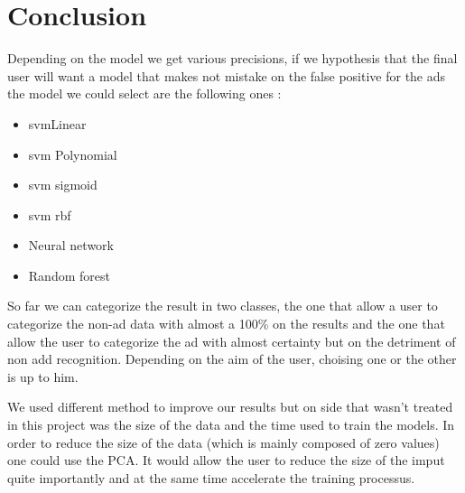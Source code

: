 \section{Conclusion}

Depending on the model we get various precisions, if we hypothesis that the final user will want a model that makes not mistake on the false positive for the ads the model we could select are the following ones :
\begin{itemize}
  \item svmLinear
  \item svm Polynomial
  \item svm sigmoid
  \item svm rbf
  \item Neural network
  \item Random forest
\end{itemize}

So far we can categorize the result in two classes, the one that allow a user to categorize the non-ad data with almost a 100\% on the results and the one that allow the user to categorize the ad with almost certainty but on the detriment of non add recognition. Depending on the aim of the user, choising one or the other is up to him.

We used different method to improve our results but on side that wasn't treated in this project was the size of the data and the time used to train the models. In order to reduce the size of the data (which is mainly composed of zero values) one could use the PCA. It would allow the user to reduce the size of the imput quite importantly and at the same time accelerate the training processus.
